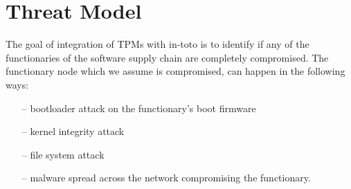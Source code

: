 \section{Threat Model}
The goal of integration of TPMs with in-toto is to identify if any of the functionaries of the software supply chain are completely compromised. The functionary node which we assume is compromised, can happen in the following ways:
\begin{itemize}
\item[--] bootloader attack on the functionary's boot firmware
\item[--] kernel integrity attack
\item[--] file system attack
\item[--] malware spread across the network compromising the functionary.
\end{itemize}
